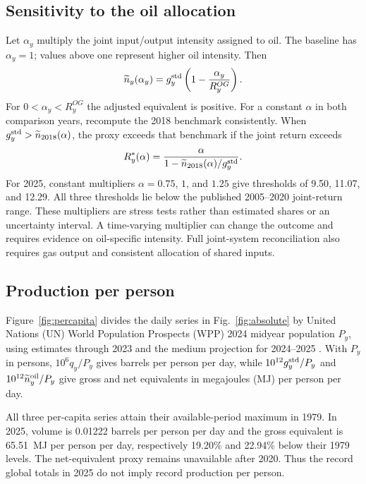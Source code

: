 \documentclass[reprint,aps,pra,longbibliography,floatfix]{revtex4-2}
\begin{document}
\subsection{Sensitivity to the oil allocation}
Let $\alpha_y$ multiply the joint input/output intensity assigned to oil. The baseline has $\alpha_y=1$; values above one represent higher oil intensity. Then
\begin{equation}
 \widetilde n_y(\alpha_y)=g_y^{\rm std}
 \left(1-\frac{\alpha_y}{R_y^{OG}}\right).
 \label{eq:allocation}
\end{equation}
For $0<\alpha_y<R_y^{OG}$ the adjusted equivalent is positive. For a constant $\alpha$ in both comparison years, recompute the 2018 benchmark consistently. When $g_y^{\rm std}>\widetilde n_{2018}(\alpha)$, the proxy exceeds that benchmark if the joint return exceeds
\begin{equation}
 R_y^*(\alpha)=\frac{\alpha}
 {1-\widetilde n_{2018}(\alpha)/g_y^{\rm std}}.
 \label{eq:allocationthreshold}
\end{equation}
For 2025, constant multipliers $\alpha=0.75$, $1$, and $1.25$ give thresholds of 9.50, 11.07, and 12.29. All three thresholds lie below the published 2005--2020 joint-return range. These multipliers are stress tests rather than estimated shares or an uncertainty interval. A time-varying multiplier can change the outcome and requires evidence on oil-specific intensity. Full joint-system reconciliation also requires gas output and consistent allocation of shared inputs.

\subsection{Production per person}
Figure~\ref{fig:percapita} divides the daily series in Fig.~\ref{fig:absolute} by United Nations (UN) World Population Prospects (WPP) 2024 midyear population $P_y$, using estimates through 2023 and the medium projection for 2024--2025 \citep{unwpp2024oil}. With $P_y$ in persons, $10^6q_y/P_y$ gives barrels per person per day, while $10^{12}g_y^{\rm std}/P_y$ and $10^{12}\widetilde n_y^{\rm oil}/P_y$ give gross and net equivalents in megajoules (MJ) per person per day.

All three per-capita series attain their available-period maximum in 1979. In 2025, volume is 0.01222 barrels per person per day and the gross equivalent is 65.51~MJ per person per day, respectively 19.20\% and 22.94\% below their 1979 levels. The net-equivalent proxy remains unavailable after 2020. Thus the record global totals in 2025 do not imply record production per person.
\end{document}
